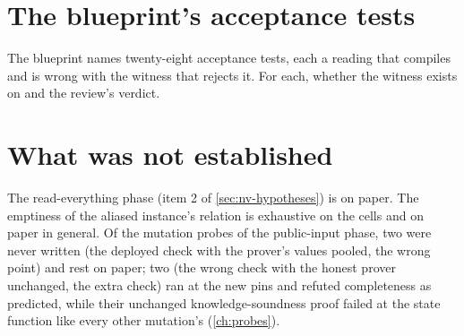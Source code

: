 \section{The blueprint's acceptance tests}\label{sec:nv-acceptance}

The blueprint names twenty-eight acceptance tests, each a reading that compiles and is wrong
with the witness that rejects it. For each, whether the witness exists on  and the
review's verdict.

\section{What was not established}\label{sec:nv-open}

The read-everything phase (item 2 of \cref{sec:nv-hypotheses}) is on paper. The emptiness of
the aliased instance's relation is exhaustive on the cells and on paper in general. Of the
mutation probes of the public-input phase, two were never written (the deployed check with the
prover's values pooled, the wrong point) and rest on paper; two (the wrong check with the
honest prover unchanged, the extra check) ran at the new pins and refuted completeness as
predicted, while their unchanged knowledge-soundness proof failed at the state function like
every other mutation's (\cref{ch:probes}).
